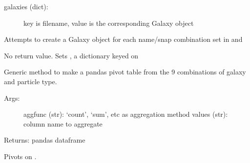 \documentclass[letterpaper,10pt,english]{sphinxmanual}
\begin{document}
\begin{fulllineitems}
\begin{description}
\begin{description}
\item[{galaxies (dict):}] \leavevmode
key is filename, value is the corresponding Galaxy object

\end{description}

\end{description}

\begin{fulllineitems}
\label{\detokenize{galaxies:galaxy.galaxies.Galaxies.read_data_files}}
Attempts to create a Galaxy object for each name/snap combination
set in  and 

No return value.
Sets , a dictionary keyed on 

\end{fulllineitems}


\begin{fulllineitems}
\label{\detokenize{galaxies:galaxy.galaxies.Galaxies.get_pivot}}
Generic method to make a pandas pivot table from the 9 combinations of 
galaxy and particle type.
\begin{description}
\item[{Args:}] \leavevmode
aggfunc (str): ‘count’, ‘sum’, etc as aggregation method
values (str): column name to aggregate

\end{description}

Returns: pandas dataframe

\end{fulllineitems}


\begin{fulllineitems}
\label{\detokenize{galaxies:galaxy.galaxies.Galaxies.get_counts_pivot}}
Pivots on .


\end{fulllineitems}
\end{fulllineitems}
\end{document}
